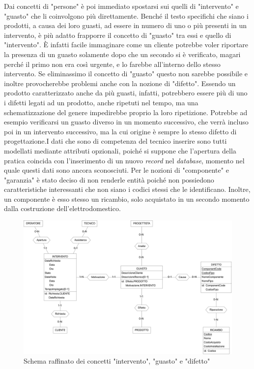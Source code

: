 \documentclass[a4paper, 12pt]{report}
\begin{document}
Dai concetti di "persone" è poi immediato spostarsi sui quelli di "intervento" e "guasto" che li coinvolgono più direttamente. Benché il testo
specifichi che siano i prodotti, a causa dei loro guasti, ad essere in numero di uno o più presenti in un intervento, è più adatto frapporre il
concetto di "guasto" tra essi e quello di "intervento". È infatti facile immaginare come un cliente potrebbe voler riportare la presenza
di un guasto solamente dopo che un secondo si è verificato, magari perché il primo non era così urgente, e lo farebbe all'interno dello stesso intervento.
Se eliminassimo il concetto di "guasto" questo non sarebbe possibile e inoltre provocherebbe problemi anche con la nozione di "difetto". Essendo
un prodotto caratterizzato anche da più guasti, infatti, potrebbero essere più di uno i difetti legati ad un prodotto, anche ripetuti nel tempo,
ma una schematizzazione del genere impedirebbe proprio la loro ripetizione. Potrebbe ad esempio verificarsi un guasto diverso in un momento successivo,
che verrà incluso poi in un intervento successivo, ma la cui origine è sempre lo stesso difetto di progettazione.\newline I dati che sono di competenza del tecnico
inserire sono tutti modellati mediante attributi opzionali, poiché si suppone che l'apertura della pratica coincida con l'inserimento di un nuovo
\textit{record} nel \textit{database}, momento nel quale questi dati sono ancora sconosciuti. Per le nozioni di "componente" e "garanzia" è stato
deciso di non renderle entità poiché non possiedono caratteristiche interessanti che non siano i codici stessi che le identificano. Inoltre, un componente
è esso stesso un ricambio, solo acquistato in un secondo momento dalla costruzione dell'elettrodomestico.

\begin{figure}[H]
	\centering
	\includegraphics[width=\linewidth]{images/interventi.png}
	\caption{Schema raffinato dei concetti "intervento", "guasto" e "difetto"}
\end{figure}
\end{document}
